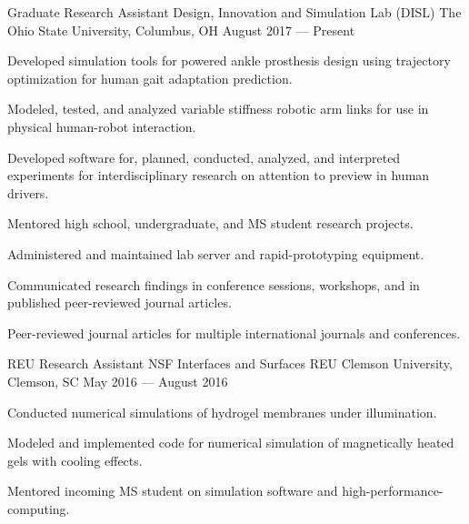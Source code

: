 


\begin{cventries}
  \cventry
    {Graduate Research Assistant} %
    {Design, Innovation and Simulation Lab (DISL)} %
    {The Ohio State University, Columbus, OH} %
    {August 2017 --- Present} %
    {
      \begin{cvitems} %
      	\item{Developed simulation tools for powered ankle prosthesis design using trajectory optimization for human gait adaptation prediction.}
        \item{Modeled, tested, and analyzed variable stiffness robotic arm links for use in physical human-robot interaction.}
        \item{Developed software for, planned, conducted, analyzed, and interpreted experiments for interdisciplinary research on attention to preview in human drivers.}
        \item{Mentored high school, undergraduate, and MS student research projects.}
        \item{Administered and maintained lab server and rapid-prototyping equipment.}
        \item{Communicated research findings in conference sessions, workshops, and in published peer-reviewed journal articles.}
        \item{Peer-reviewed journal articles for multiple international journals and conferences.}
      \end{cvitems}
    }

  \cventry
    {REU Research Assistant} %
    {NSF Interfaces and Surfaces REU} %
    {Clemson University, Clemson, SC} %
    {May 2016 --- August 2016} %
    {
      \begin{cvitems} %
        \item {Conducted numerical simulations of hydrogel membranes under illumination.}
        \item {Modeled and implemented code for numerical simulation of magnetically heated gels with cooling effects.}
        \item {Mentored incoming MS student on simulation software and high-performance-computing.}
      \end{cvitems}
    }


\end{cventries}
